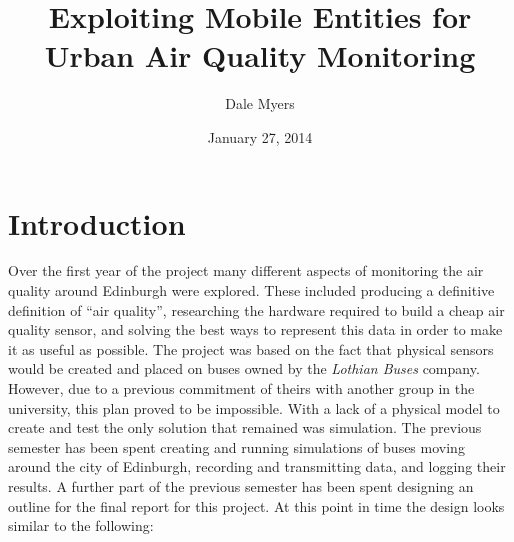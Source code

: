 \documentclass[12pt,a4paper,notitlepage]{article}
\title{Exploiting Mobile Entities for Urban Air Quality Monitoring}
\author{Dale Myers}
\date{January 27, 2014}
\begin{document}
\maketitle
\thispagestyle{empty}
\newpage

\tableofcontents
\thispagestyle{empty}

\newpage

\setcounter{page}{1}



\section{Introduction}

Over the first year of the project many different aspects of monitoring the air quality around Edinburgh were explored. These included producing a definitive definition of ``air quality'', researching the hardware required to build a cheap air quality sensor, and solving the best ways to represent this data in order to make it as useful as possible. The project was based on the fact that physical sensors would be created and placed on buses owned by the \emph{Lothian Buses} company. However, due to a previous commitment of theirs with another group in the university, this plan proved to be impossible. With a lack of a physical model to create and test the only solution that remained was simulation. The previous semester has been spent creating and running simulations of buses moving around the city of Edinburgh, recording and transmitting data, and logging their results. A further part of the previous semester has been spent designing an outline for the final report for this project. At this point in time the design looks similar to the following:
\end{document}
